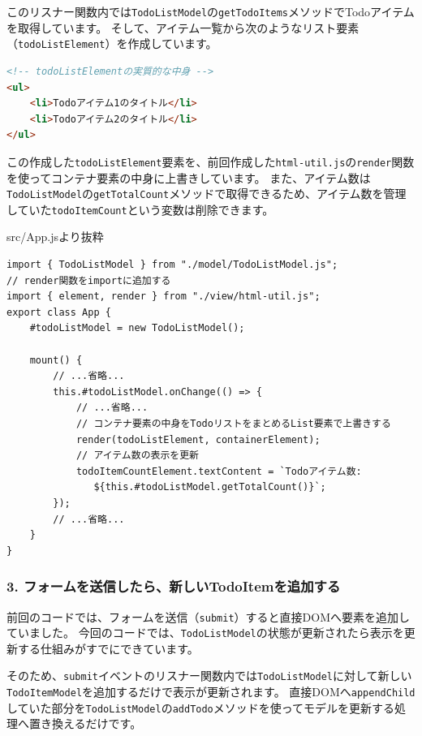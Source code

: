 このリスナー関数内では\texttt{TodoListModel}の\texttt{getTodoItems}メソッドでTodoアイテムを取得しています。
そして、アイテム一覧から次のようなリスト要素（\texttt{todoListElement}）を作成しています。

\begin{lstlisting}[language=HTML]
<!-- todoListElementの実質的な中身 -->
<ul>
    <li>Todoアイテム1のタイトル</li>
    <li>Todoアイテム2のタイトル</li>
</ul>
\end{lstlisting}

この作成した\texttt{todoListElement}要素を、前回作成した\texttt{html-util.js}の\texttt{render}関数を使ってコンテナ要素の中身に上書きしています。
また、アイテム数は\texttt{TodoListModel}の\texttt{getTotalCount}メソッドで取得できるため、アイテム数を管理していた\texttt{todoItemCount}という変数は削除できます。

\begin{listtitle}
src/App.jsより抜粋
\end{listtitle}
\begin{lstlisting}
import { TodoListModel } from "./model/TodoListModel.js";
// render関数をimportに追加する
import { element, render } from "./view/html-util.js";
export class App {
    #todoListModel = new TodoListModel();
    
    mount() {
        // ...省略...
        this.#todoListModel.onChange(() => {
            // ...省略...
            // コンテナ要素の中身をTodoリストをまとめるList要素で上書きする
            render(todoListElement, containerElement);
            // アイテム数の表示を更新
            todoItemCountElement.textContent = `Todoアイテム数: 
               ${this.#todoListModel.getTotalCount()}`;
        });
        // ...省略...
    }
}
\end{lstlisting}
\listend

\hypertarget{app-add-new-todoitem}{%
\subsubsection{3. フォームを送信したら、新しいTodoItemを追加する}\label{app-add-new-todoitem}}

前回のコードでは、フォームを送信（\texttt{submit}）すると直接DOMへ要素を追加していました。
今回のコードでは、\texttt{TodoListModel}の状態が更新されたら表示を更新する仕組みがすでにできています。

そのため、\texttt{submit}イベントのリスナー関数内では\texttt{TodoListModel}に対して新しい\texttt{TodoItemModel}を追加するだけで表示が更新されます。
直接DOMへ\texttt{appendChild}していた部分を\texttt{TodoListModel}の\texttt{addTodo}メソッドを使ってモデルを更新する処理へ置き換えるだけです。

